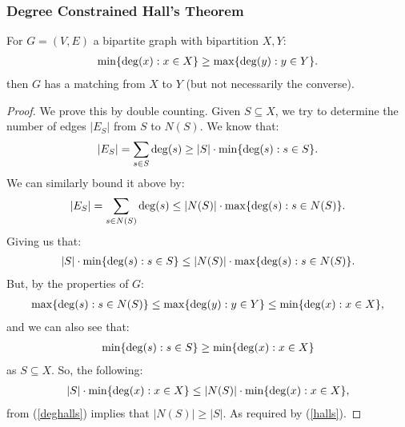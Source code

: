 \subsubsection{Degree Constrained Hall's Theorem}
For $G = (V, E)$ a bipartite graph with bipartition $X, Y$: 
\begin{gather*}
  \operatorname{min}\{\operatorname{deg}(x) : x \in X\} \geq
  \operatorname{max}\{\operatorname{deg}(y) : y \in Y\}.
\end{gather*} then $G$ has a matching from $X$ to $Y$
(but not necessarily the converse).
\begin{proof}
    We prove this by double counting. Given $S \subseteq X$, we
    try to determine the number of edges $|E_S|$ from $S$ to $N(S)$.
    We know that: \begin{gather*}
        |E_S| = \sum_{s \in S} \operatorname{deg}(s) \geq |S| \cdot \operatorname{min}\{\operatorname{deg}(s) : s \in S\}.
    \end{gather*} We can similarly bound it above by: \begin{gather*}
        |E_S| = \sum_{s \in N(S)} \operatorname{deg}(s) \leq |N(S)| \cdot \operatorname{max}\{\operatorname{deg}(s) : s \in N(S)\}.
    \end{gather*} Giving us that: \begin{gather} \label{deghalls}
        |S| \cdot \operatorname{min}\{\operatorname{deg}(s) : s \in S\}
        \leq 
        |N(S)| \cdot \operatorname{max}\{\operatorname{deg}(s) : s \in N(S)\}.
    \end{gather} But, by the properties of $G$: \begin{gather*}
        \operatorname{max}\{\operatorname{deg}(s) : s \in N(S)\} 
        \leq \operatorname{max}\{\operatorname{deg}(y) : y \in Y\}
        \leq \operatorname{min}\{\operatorname{deg}(x) : x \in X\},
    \end{gather*} and we can also see that: \begin{gather*}
        \operatorname{min}\{\operatorname{deg}(s) : s \in S\} \geq \operatorname{min}\{\operatorname{deg}(x) : x \in X\}
    \end{gather*} as $S \subseteq X$. So, the following: \begin{gather*}
        |S| \cdot \operatorname{min}\{\operatorname{deg}(x) : x \in X\} \leq |N(S)| \cdot \operatorname{min}\{\operatorname{deg}(x) : x \in X\},
    \end{gather*} from (\ref{deghalls}) implies that $|N(S)| \geq |S|$. 
    As required by (\ref{halls}).
\end{proof}